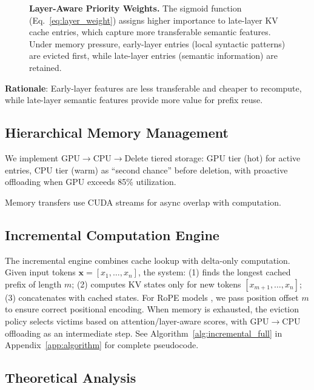 \documentclass{article}
\begin{document}
\begin{figure}[t]
\caption{\textbf{Layer-Aware Priority Weights.} The sigmoid function (Eq.~\ref{eq:layer_weight}) assigns higher importance to late-layer KV cache entries, which capture more transferable semantic features. Under memory pressure, early-layer entries (local syntactic patterns) are evicted first, while late-layer entries (semantic information) are retained.}
\label{fig:layer_weights}
\end{figure}

\textbf{Rationale}: Early-layer features are less transferable and cheaper to recompute, while late-layer semantic features provide more value for prefix reuse.

\subsection{Hierarchical Memory Management}

We implement GPU$\rightarrow$CPU$\rightarrow$Delete tiered storage: GPU tier (hot) for active entries, CPU tier (warm) as ``second chance'' before deletion, with proactive offloading when GPU exceeds 85\% utilization.

Memory transfers use CUDA streams for async overlap with computation.

\subsection{Incremental Computation Engine}

The incremental engine combines cache lookup with delta-only computation.
Given input tokens $\mathbf{x} = [x_1, \ldots, x_n]$, the system: (1) finds the longest cached prefix of length $m$; (2) computes KV states only for new tokens $[x_{m+1}, \ldots, x_n]$; (3) concatenates with cached states.
For RoPE models \citep{su2024roformer}, we pass position offset $m$ to ensure correct positional encoding.
When memory is exhausted, the eviction policy selects victims based on attention/layer-aware scores, with GPU$\rightarrow$CPU offloading as an intermediate step.
See Algorithm~\ref{alg:incremental_full} in Appendix~\ref{app:algorithm} for complete pseudocode.

\subsection{Theoretical Analysis}
\end{document}
